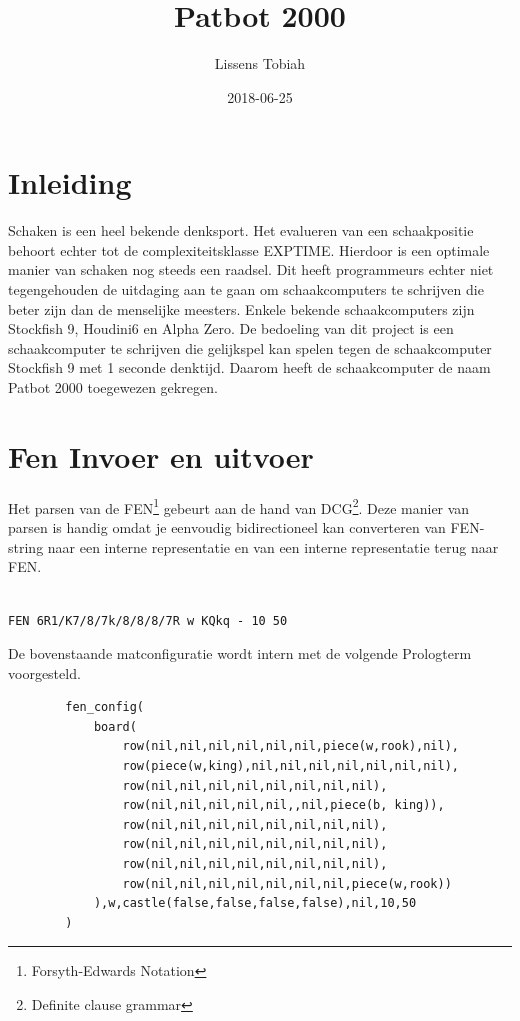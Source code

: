 \documentclass[a4paper,10pt]{article}
\title{Patbot 2000}
\author{Lissens Tobiah}
\date{2018-06-25}
\newcommand{\code}[1]{\texttt{#1}}
\begin{document}
\maketitle
\newpage
{}
\tableofcontents
\newpage


\section{Inleiding}
Schaken is een heel bekende denksport.
Het evalueren van een schaakpositie behoort echter tot de complexiteitsklasse EXPTIME.
Hierdoor is een optimale manier van schaken nog steeds een raadsel.
Dit heeft programmeurs echter niet tegengehouden de uitdaging aan te gaan om schaakcomputers te schrijven die beter zijn dan de menselijke meesters.
Enkele bekende schaakcomputers zijn Stockfish 9, Houdini6 en Alpha Zero.
De bedoeling van dit project is een schaakcomputer te schrijven die gelijkspel kan spelen tegen de schaakcomputer Stockfish 9 met 1 seconde denktijd.
Daarom heeft de schaakcomputer de naam Patbot 2000 toegewezen gekregen. 
 

    
\section{Fen Invoer en uitvoer}
    Het parsen van de FEN\footnote{Forsyth-Edwards Notation} gebeurt aan de hand van DCG\footnote{Definite clause grammar}.
    Deze manier van parsen is handig omdat je eenvoudig bidirectioneel kan converteren van FEN-string naar een interne representatie en van een interne representatie terug naar FEN.
    
    \begin{center}
        \newgame
        \showboard
        \\
        \code{FEN 6R1/K7/8/7k/8/8/8/7R w KQkq - 10 50}
    \end{center}
    
    
De bovenstaande matconfiguratie wordt intern met de volgende Prologterm voorgesteld.


    \begin{lstlisting}
        fen_config(
            board(
                row(nil,nil,nil,nil,nil,nil,piece(w,rook),nil),
                row(piece(w,king),nil,nil,nil,nil,nil,nil,nil),
                row(nil,nil,nil,nil,nil,nil,nil,nil),
                row(nil,nil,nil,nil,nil,,nil,piece(b, king)),
                row(nil,nil,nil,nil,nil,nil,nil,nil),
                row(nil,nil,nil,nil,nil,nil,nil,nil),
                row(nil,nil,nil,nil,nil,nil,nil,nil),
                row(nil,nil,nil,nil,nil,nil,nil,piece(w,rook))
            ),w,castle(false,false,false,false),nil,10,50
        )
    \end{lstlisting}
    
\end{document}
